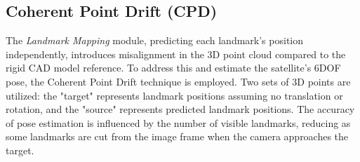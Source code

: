 \documentclass[conference]{IEEEtran}
\begin{document}
\subsection{Coherent Point Drift (CPD)}
The \textit{Landmark Mapping} module, predicting each landmark's position independently, introduces misalignment in the 3D point cloud compared to the rigid CAD model reference. To address this and estimate the satellite's 6DOF pose, the Coherent Point Drift technique is employed. Two sets of 3D points are utilized: the "target" represents landmark positions assuming no translation or rotation, and the "source" represents predicted landmark positions. The accuracy of pose estimation is influenced by the number of visible landmarks, reducing as some landmarks are cut from the image frame when the camera approaches the target.
\begin{table}[ht]
\centering
{}
    \caption{\label{tab1}Results on train set with multi and single model configurations.}
\end{table}

\begin{table}[ht]
\centering
{}
    
    \caption{\label{tab2}Results on test set with multi-model configuration.}
\end{table}
\end{document}
